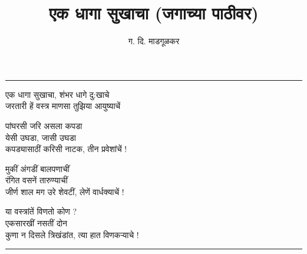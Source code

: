 \documentclass[17pt]{extarticle}  %
\begin{document}
\title{एक धागा सुखाचा (जगाच्या पाठीवर)}
\author{ग. दि. माडगूळकर}
\date{}
\maketitle
\hrule
\vspace{5mm}



एक धागा सुखाचा, शंभर धागे दु:खाचे\\
जरतारी हें वस्त्र माणसा तुझिया आयुष्याचें
\vspace{\baselineskip}

\vin पांघरसी जरि असला कपडा\\
\vin येसी उघडा, जासी उघडा\\
कपड्यासाठीं करिसी नाटक, तीन प्रवेशांचें !
\vspace{\baselineskip}

\vin मुकीं अंगडीं बालपणाचीं\\
\vin रंगित वसनें तारुण्याचीं\\
जीर्ण शाल मग उरे शेवटीं, लेणें वार्धक्याचें !
\vspace{\baselineskip}

\vin या वस्त्रांतें विणतो कोण ?\\
\vin एकसारखीं नसतीं दोन\\
कुणा न दिसले त्रिखंडांत, त्या हात विणकर्‍याचे !



\vspace{5mm}
\hrule
\end{document}
